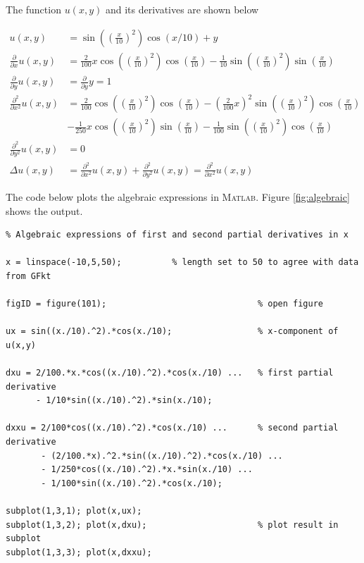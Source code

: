 \documentclass[paper=a4, fontsize=12pt]{article} %
\begin{document}
The function $u(x,y)$ and its derivatives are shown below

\begin{align*}
u(x,y) &= \sin\left(\left(\frac{x}{10}\right) ^2\right ) \cos(x/10)+y \\
\frac{\partial}{\partial x} u(x,y) &= \frac{2}{100}x\cos\left(\left(\frac{x}{10}\right) ^2\right )\cos\left(\frac{x}{10}\right )- \frac{1}{10}\sin\left(\left(\frac{x}{10}\right) ^2\right )\sin\left (\frac{x}{10}\right )\\
\frac{\partial}{\partial y} u(x,y) &= \frac{\partial}{\partial y}y = 1   \\
\frac{\partial^2}{\partial x^2} u(x,y) &= \frac{2}{100}\cos\left(\left(\frac{x}{10}\right) ^2\right )\cos\left(\frac{x}{10}\right ) - \left ( \frac{2}{100}x\right )^2 \sin \left(\left(\frac{x}{10}\right) ^2\right )\cos\left(\frac{x}{10}\right ) \\
 &- \frac{1}{250}x\cos\left(\left(\frac{x}{10}\right) ^2\right )\sin\left(\frac{x}{10}\right ) - \frac{1}{100}\sin\left(\left(\frac{x}{10}\right) ^2\right )\cos\left (\frac{x}{10}\right )\\
\frac{\partial^2}{\partial y^2} u(x,y) &= 0 \\
\Delta u(x,y) &= \frac{\partial^2}{\partial x^2} u(x,y) + \frac{\partial^2}{\partial y^2} u(x,y) =  \frac{\partial^2}{\partial x^2} u(x,y)
\end{align*}


\newpage

The code below plots the algebraic expressions in \textsc{Matlab}. Figure \ref{fig:algebraic} shows the output.

\begin{lstlisting}
% Algebraic expressions of first and second partial derivatives in x

x = linspace(-10,5,50);		     % length set to 50 to agree with data from GFkt

figID = figure(101);                              % open figure

ux = sin((x./10).^2).*cos(x./10);                 % x-component of u(x,y)

dxu = 2/100.*x.*cos((x./10).^2).*cos(x./10) ...   % first partial derivative
      - 1/10*sin((x./10).^2).*sin(x./10);

dxxu = 2/100*cos((x./10).^2).*cos(x./10) ...      % second partial derivative
       - (2/100.*x).^2.*sin((x./10).^2).*cos(x./10) ...
       - 1/250*cos((x./10).^2).*x.*sin(x./10) ...
       - 1/100*sin((x./10).^2).*cos(x./10);

subplot(1,3,1); plot(x,ux);
subplot(1,3,2); plot(x,dxu);                      % plot result in subplot
subplot(1,3,3); plot(x,dxxu);

\end{lstlisting}
\end{document}
